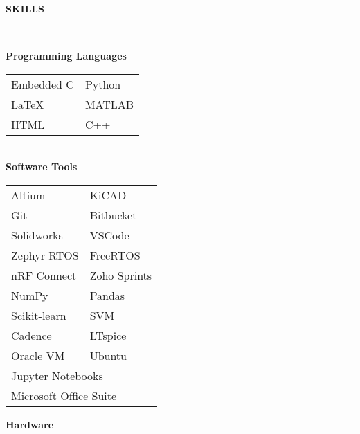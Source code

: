 \documentclass[10pt,letterpaper]{article}
\def\bulletspace{0.1mm} %
\newcommand{\header}[2] {
    \vspace{10pt}
        {\LARGE\faIcon{#1}}\hspace{0.5em}\textbf{\LARGE{\uppercase{#2} } }
        \vspace{-5pt} \\
        \rule{0.1 \textwidth}{1pt}\hfill \\
}
\newcommand{\bulletp}{
    \textbullet \hspace{\bulletspace}
}
\begin{document}
\begin{paracol}{2}
\begin{leftcolumn}
    \vspace{1em}
    \header{cogs}{SKILLS}
    \large{\textbf{Programming Languages} }\\
    \vspace{-1.8em}
    \raggedright{
        \begin{table}[h!]
            \begin{tabular}{p{7em} p{7em}}
                \bulletp Embedded C & \bulletp Python \\
                \bulletp LaTeX & \bulletp MATLAB \\
                \bulletp HTML & \bulletp C++\\
            \end{tabular}
        \end{table}
    } \\
    \vspace{-8pt}
    \large{\textbf{Software Tools} }\\
    \vspace{-0.55em}
    \raggedright{
        \begin{table}[h!]
            \begin{tabular}{p{7em} p{7em}}
                \bulletp Altium & \bulletp KiCAD\\
                \bulletp Git & \bulletp Bitbucket\\
                \bulletp Solidworks & \bulletp VSCode\\
                \bulletp Zephyr RTOS & \bulletp FreeRTOS\\
                \bulletp nRF Connect & \bulletp Zoho Sprints\\
                \bulletp NumPy & \bulletp Pandas\\
                \bulletp Scikit-learn & \bulletp SVM\\
                \bulletp Cadence & \bulletp LTspice\\
                \bulletp Oracle VM & \bulletp Ubuntu\\
                \multicolumn{2}{l}{\bulletp Jupyter Notebooks}\\
                \multicolumn{2}{l}{\bulletp Microsoft Office Suite}\\
            \end{tabular}
        \end{table}
    }
    \vspace{-10pt}
    \large{\textbf{Hardware} }\\ %

\end{leftcolumn}
\end{paracol}
\end{document}
